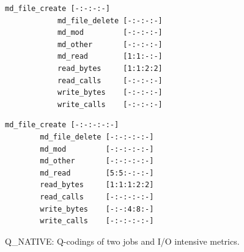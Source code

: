 \documentclass{jhps}
\begin{document}
\begin{listing}
		\noindent\begin{minipage}{0.49\textwidth}
			\begin{lstlisting}[basicstyle=\fontsize{8}{8}\ttfamily]
			md_file_create [-:-:-:-]
			md_file_delete [-:-:-:-]
			md_mod         [-:-:-:-]
			md_other       [-:-:-:-]
			md_read        [1:1:-:-]
			read_bytes     [1:1:2:2]
			read_calls     [-:-:-:-]
			write_bytes    [-:-:-:-]
			write_calls    [-:-:-:-]
			\end{lstlisting}
			\vspace{-2em}
		\end{minipage}
		\noindent\begin{minipage}{0.49\textwidth}
		\begin{lstlisting}[basicstyle=\fontsize{8}{8}\ttfamily]
		md_file_create [-:-:-:-:-]
		md_file_delete [-:-:-:-:-]
		md_mod         [-:-:-:-:-]
		md_other       [-:-:-:-:-]
		md_read        [5:5:-:-:-]
		read_bytes     [1:1:1:2:2]
		read_calls     [-:-:-:-:-]
		write_bytes    [-:-:4:8:-]
		write_calls    [-:-:-:-:-]
		\end{lstlisting}
		\vspace{-2em}
		\end{minipage}
	\caption{Q\_NATIVE: Q-codings of two jobs and I/O intensive metrics.}
  \label{lst:sim:hex_native:jobs}
\end{listing}



\end{document}
